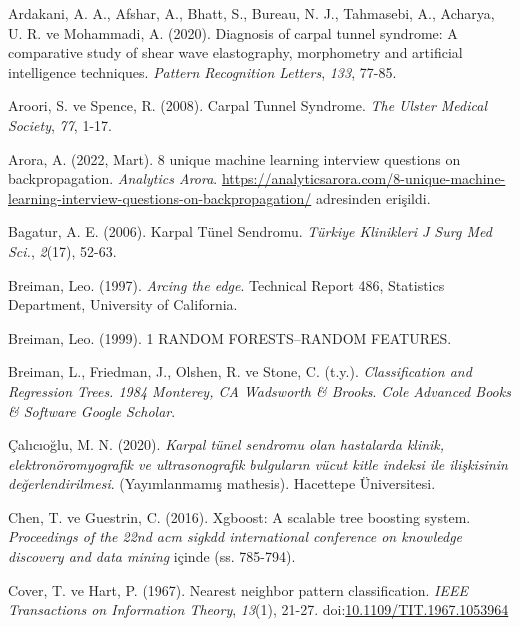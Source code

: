 \documentclass[12pt,twoside]{deuthesis}
\begin{document}
\hypertarget{refs}{}
\begin{CSLReferences}{1}{0}
\leavevmode{}%
Ardakani, A. A., Afshar, A., Bhatt, S., Bureau, N. J., Tahmasebi, A., Acharya, U. R. ve Mohammadi, A. (2020). Diagnosis of carpal tunnel syndrome: A comparative study of shear wave elastography, morphometry and artificial intelligence techniques. \emph{Pattern Recognition Letters}, \emph{133}, 77-85.

\leavevmode{}%
Aroori, S. ve Spence, R. (2008). Carpal Tunnel Syndrome. \emph{The Ulster Medical Society}, \emph{77}, 1-17.

\leavevmode{}%
Arora, A. (2022, Mart). 8 unique machine learning interview questions on backpropagation. \emph{Analytics Arora}. \url{https://analyticsarora.com/8-unique-machine-learning-interview-questions-on-backpropagation/} adresinden erişildi.

\leavevmode{}%
Bagatur, A. E. (2006). Karpal Tünel Sendromu. \emph{Türkiye Klinikleri J Surg Med Sci.}, \emph{2}(17), 52-63.

\leavevmode{}%
Breiman, Leo. (1997). \emph{Arcing the edge}. Technical Report 486, Statistics Department, University of California.

\leavevmode{}%
Breiman, Leo. (1999). 1 RANDOM FORESTS--RANDOM FEATURES.

\leavevmode{}%
Breiman, L., Friedman, J., Olshen, R. ve Stone, C. (t.y.). \emph{Classification and Regression Trees. 1984 Monterey, CA Wadsworth \& Brooks}. \emph{Cole Advanced Books \& Software Google Scholar}.

\leavevmode{}%
Çalıcıoğlu, M. N. (2020). \emph{Karpal tünel sendromu olan hastalarda klinik, elektronöromyografik ve ultrasonografik bulguların vücut kitle indeksi ile ilişkisinin değerlendirilmesi}. (Yayımlanmamış mathesis). Hacettepe Üniversitesi.

\leavevmode{}%
Chen, T. ve Guestrin, C. (2016). Xgboost: A scalable tree boosting system. \emph{Proceedings of the 22nd acm sigkdd international conference on knowledge discovery and data mining} içinde (ss. 785-794).

\leavevmode{}%
Cover, T. ve Hart, P. (1967). Nearest neighbor pattern classification. \emph{IEEE Transactions on Information Theory}, \emph{13}(1), 21-27. doi:\href{https://doi.org/10.1109/TIT.1967.1053964}{10.1109/TIT.1967.1053964}


\end{CSLReferences}
\end{document}
